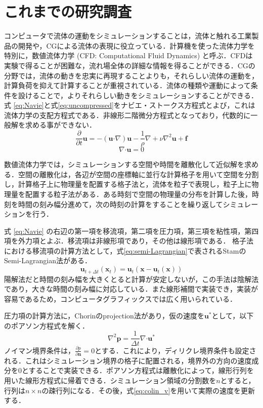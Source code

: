 \documentclass[10pt,a4paper,notitlepage,oneside,twocolumn]{abst_jsarticle}
\begin{document}
\section{これまでの研究調査} \label{sec:intro}
コンピュータで流体の運動をシミュレーションすることは，流体と触れる工業製品の開発や，CGによる流体の表現に役立っている．計算機を使った流体力学を特別に，数値流体力学 (CFD: Computational Fluid Dynamics) と呼ぶ．CFDは実験で得ることが困難な，流れ場全体の詳細な情報を得ることができる．CGの分野では，流体の動きを忠実に再現することよりも，それらしい流体の運動を，計算負荷を抑えて計算することが重視されている．流体の種類や運動によって条件を設けることで，よりそれらしい動きをシミュレーションすることができる．
式 \ref{eq:Navie}と式\ref{eq:uncompressed}をナビエ・ストークス方程式とよび，これは流体力学の支配方程式である．非線形二階微分方程式となっており，代数的に一般解を求める事ができない．
\begin{equation}\label{eq:Navie}
\frac{\partial}{\partial t}\bm{u} = - (\bm{u} \boldsymbol{\cdot}\nabla) \bm{u} - \frac{1}{\rho}\nabla + \nu\nabla^2\bm{u} + \bm{f}
\end{equation}
\begin{equation}\label{eq:uncompressed}
\nabla\boldsymbol{\cdot}\bm{u} = 0
\end{equation}

数値流体力学では，シミュレーションする空間や時間を離散化して近似解を求める．空間の離散化は，各辺が空間の座標軸に並行な計算格子を用いて空間を分割し，計算格子上に物理量を配置する格子法と，流体を粒子で表現し，粒子上に物理量を配置する粒子法がある．ある時刻で空間の物理量の分布を計算した後，時刻を時間の刻み幅分進めて，次の時刻の計算をすることを繰り返してシミュレーションを行う．

式 \ref{eq:Navie} の右辺の第一項を移流項，第二項を圧力項，第三項を粘性項，第四項を外力項とよぶ．移流項は非線形項であり，その他は線形項である．
格子法における移流項の計算方法として，式\ref{eq:semi-Lagrangian}で表されるStamのSemi-Lagrangian法\cite{semi-Lagrangian}がある．
\begin{equation}\label{eq:semi-Lagrangian}
\bm{u}_{t+\Delta t}(\bm{x}_t) = \bm{u}_t(\bm{x}-\bm{u}_t(\bm{x}))
\end{equation}
陽解法だと時間の刻み幅を大きくとると計算が安定しないが，この手法は陰解法であり，大きな時間の刻み幅に対応している．また線形補間で実装でき，実装が容易であるため，コンピュータグラフィックスでは広く用いられている．

圧力項の計算方法に，Chorinのprojection法\cite{projection}があり，仮の速度を$\bm{u}^*$として，以下のポアソン方程式を解く．
\begin{equation}\label{eq:colin_p}
\nabla^2 \bm{p} =  \frac{1}{\Delta t}\nabla\boldsymbol{\cdot}\bm{u}^*
\end{equation} 
ノイマン境界条件は，$\frac{\partial p}{\partial \bm{n}} = 0$とする．これにより，ディリクレ境界条件も設定される．これはシミュレーション境界の格子に配置される，境界外の方向の速度成分を$0$とすることで実装できる．ポアソン方程式は離散化によって，線形行列を用いた線形方程式に帰着できる．シミュレーション領域の分割数を$n$とすると，行列は$n \times n$の疎行列になる．その後，式\ref{eq:colin_v}を用いて実際の速度を更新する．
\end{document}
